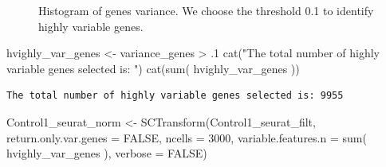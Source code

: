 \documentclass[
  letterpaper,
  DIV=11,
  numbers=noendperiod]{scrartcl}
\newenvironment{Shaded}{}{}
\newcommand{\AttributeTok}[1]{\textcolor[rgb]{0.49,0.56,0.16}{#1}}
\newcommand{\ConstantTok}[1]{\textcolor[rgb]{0.53,0.00,0.00}{#1}}
\newcommand{\DecValTok}[1]{\textcolor[rgb]{0.25,0.63,0.44}{#1}}
\newcommand{\FunctionTok}[1]{\textcolor[rgb]{0.02,0.16,0.49}{#1}}
\newcommand{\NormalTok}[1]{#1}
\newcommand{\OtherTok}[1]{\textcolor[rgb]{0.00,0.44,0.13}{#1}}
\newcommand{\SpecialCharTok}[1]{\textcolor[rgb]{0.25,0.44,0.63}{#1}}
\newcommand{\StringTok}[1]{\textcolor[rgb]{0.25,0.44,0.63}{#1}}
\begin{document}
\begin{figure}[H]


\caption{\label{fig-hvg}Histogram of genes variance. We choose the
threshold 0.1 to identify highly variable genes.}

\end{figure}%

\begin{Shaded}
\begin{Highlighting}[]
\NormalTok{hvighly\_var\_genes }\OtherTok{\textless{}{-}}\NormalTok{ variance\_genes }\SpecialCharTok{\textgreater{}}\NormalTok{ .}\DecValTok{1}
\FunctionTok{cat}\NormalTok{(}\StringTok{"The total number of highly variable genes selected is: "}\NormalTok{)}
\FunctionTok{cat}\NormalTok{(}\FunctionTok{sum}\NormalTok{( hvighly\_var\_genes ))}
\end{Highlighting}
\end{Shaded}

\begin{verbatim}
The total number of highly variable genes selected is: 9955
\end{verbatim}

\begin{Shaded}
\begin{Highlighting}[]
\NormalTok{Control1\_seurat\_norm }\OtherTok{\textless{}{-}} \FunctionTok{SCTransform}\NormalTok{(Control1\_seurat\_filt, }
                                             \AttributeTok{return.only.var.genes =} \ConstantTok{FALSE}\NormalTok{, }
                                             \AttributeTok{ncells =} \DecValTok{3000}\NormalTok{, }
                                             \AttributeTok{variable.features.n =} \FunctionTok{sum}\NormalTok{( hvighly\_var\_genes ),}
                                             \AttributeTok{verbose =} \ConstantTok{FALSE}\NormalTok{)}
\end{Highlighting}
\end{Shaded}
\end{document}

